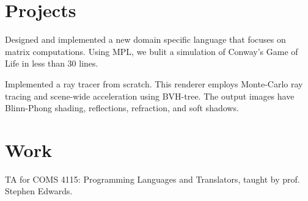 \documentclass[]{deedy-resume-openfont}
\begin{document}
\begin{minipage}[t]{0.66\textwidth}

\section{Projects}

Designed and implemented a new domain specific language that focuses on matrix computations. Using MPL, we bulit a simulation of Conway's Game of Life in less than 30 lines.
\sectionsep

Implemented a ray tracer from scratch. This renderer employs Monte-Carlo ray tracing and scene-wide acceleration using BVH-tree. The output images have Blinn-Phong shading, reflections, refraction, and soft shadows.
\sectionsep





\section{Work}

TA for COMS 4115: Programming Languages and Translators, taught by prof. Stephen Edwards.
\sectionsep



\end{minipage}
\end{document}
